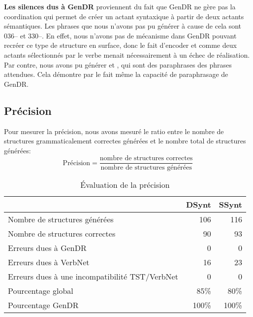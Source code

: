 \textbf{Les silences dus à GenDR} proviennent du fait que GenDR ne gère pas la coordination qui permet de créer un actant syntaxique à partir de deux actants sémantiques. Les phrases que nous n'avons pas pu générer à cause de cela sont 036-- et 330--. En effet, nous n'avons pas de mécanisme dans GenDR pouvant recréer ce type de structure en surface, donc le fait d'encoder  et  comme deux actants sélectionnés par le verbe menait nécessairement à un échec de réalisation. Par contre, nous avons pu générer  et , qui sont des paraphrases des phrases attendues. Cela démontre par le fait même la capacité de paraphrasage de GenDR.

\subsection{Précision}\label{sec:precision}
Pour mesurer la précision, nous avons mesuré le ratio entre le nombre de structures grammaticalement correctes générées et le nombre total de structures générées:
\[\text{Précision} = \frac{\text{nombre de structures correctes}}{\text{nombre de structures générées}}\]

\begin{table}
\caption{Évaluation de la précision}
\begin{tabular}{lrr}
 \toprule
  & DSynt & SSynt\\
 \midrule
 Nombre de structures générées   & 106  & 116 \\
 Nombre de structures correctes  &  90  & 93   \\
 Erreurs dues à GenDR & 0 & 0\\
 Erreurs dues à VerbNet    & 16 & 23\\
 Erreurs dues à une incompatibilité TST/VerbNet & 0 & 0\\
 \midrule
 Pourcentage global & 85\%  & 80\% \\
 Pourcentage GenDR & 100\%  & 100\% \\
 \bottomrule
\end{tabular}
\end{table}

